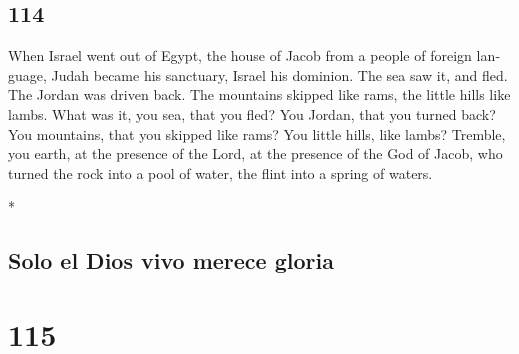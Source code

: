 \begin{paracol}{2}
\switchcolumn
\begin{otherlanguage}{english}

\hypertarget{section-227}{%
\section{114}\label{section-227}}

 When Israel went out of Egypt, the house of Jacob from a
people of foreign language,  Judah became his sanctuary,
Israel his dominion.  The sea saw it, and fled. The Jordan
was driven back.  The mountains skipped like rams, the
little hills like lambs.  What was it, you sea, that you
fled? You Jordan, that you turned back?  You mountains,
that you skipped like rams? You little hills, like lambs? 
Tremble, you earth, at the presence of the Lord, at the presence of the
God of Jacob,  who turned the rock into a pool of water,
the flint into a spring of waters.

\end{otherlanguage}

\switchcolumn[0]*

\hypertarget{solo-el-dios-vivo-merece-gloria}{%
\subsection{Solo el Dios vivo merece
gloria}\label{solo-el-dios-vivo-merece-gloria}}

\hypertarget{section-228}{%
\section{115}\label{section-228}}


\end{paracol}
